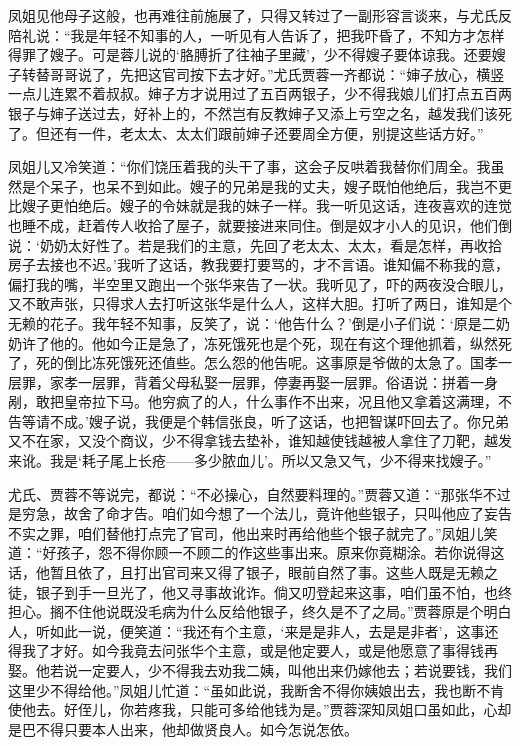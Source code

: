 凤姐见他母子这般，也再难往前施展了，只得又转过了一副形容言谈来，与尤氏反陪礼说：“我是年轻不知事的人，一听见有人告诉了，把我吓昏了，不知方才怎样得罪了嫂子。可是蓉儿说的‘胳膊折了往袖子里藏’，少不得嫂子要体谅我。还要嫂子转替哥哥说了，先把这官司按下去才好。”尤氏贾蓉一齐都说：“婶子放心，横竖一点儿连累不着叔叔。婶子方才说用过了五百两银子，少不得我娘儿们打点五百两银子与婶子送过去，好补上的，不然岂有反教婶子又添上亏空之名，越发我们该死了。但还有一件，老太太、太太们跟前婶子还要周全方便，别提这些话方好。”

凤姐儿又冷笑道：“你们饶压着我的头干了事，这会子反哄着我替你们周全。我虽然是个呆子，也呆不到如此。嫂子的兄弟是我的丈夫，嫂子既怕他绝后，我岂不更比嫂子更怕绝后。嫂子的令妹就是我的妹子一样。我一听见这话，连夜喜欢的连觉也睡不成，赶着传人收拾了屋子，就要接进来同住。倒是奴才小人的见识，他们倒说：‘奶奶太好性了。若是我们的主意，先回了老太太、太太，看是怎样，再收拾房子去接也不迟。’我听了这话，教我要打要骂的，才不言语。谁知偏不称我的意，偏打我的嘴，半空里又跑出一个张华来告了一状。我听见了，吓的两夜没合眼儿，又不敢声张，只得求人去打听这张华是什么人，这样大胆。打听了两日，谁知是个无赖的花子。我年轻不知事，反笑了，说：‘他告什么？’倒是小子们说：‘原是二奶奶许了他的。他如今正是急了，冻死饿死也是个死，现在有这个理他抓着，纵然死了，死的倒比冻死饿死还值些。怎么怨的他告呢。这事原是爷做的太急了。国孝一层罪，家孝一层罪，背着父母私娶一层罪，停妻再娶一层罪。俗语说：拼着一身剐，敢把皇帝拉下马。他穷疯了的人，什么事作不出来，况且他又拿着这满理，不告等请不成。’嫂子说，我便是个韩信张良，听了这话，也把智谋吓回去了。你兄弟又不在家，又没个商议，少不得拿钱去垫补，谁知越使钱越被人拿住了刀靶，越发来讹。我是‘耗子尾上长疮------多少脓血儿’。所以又急又气，少不得来找嫂子。”

尤氏、贾蓉不等说完，都说：“不必操心，自然要料理的。”贾蓉又道：“那张华不过是穷急，故舍了命才告。咱们如今想了一个法儿，竟许他些银子，只叫他应了妄告不实之罪，咱们替他打点完了官司，他出来时再给他些个银子就完了。”凤姐儿笑道：“好孩子，怨不得你顾一不顾二的作这些事出来。原来你竟糊涂。若你说得这话，他暂且依了，且打出官司来又得了银子，眼前自然了事。这些人既是无赖之徒，银子到手一旦光了，他又寻事故讹诈。倘又叨登起来这事，咱们虽不怕，也终担心。搁不住他说既没毛病为什么反给他银子，终久是不了之局。”贾蓉原是个明白人，听如此一说，便笑道：“我还有个主意，‘来是是非人，去是是非者’，这事还得我了才好。如今我竟去问张华个主意，或是他定要人，或是他愿意了事得钱再娶。他若说一定要人，少不得我去劝我二姨，叫他出来仍嫁他去；若说要钱，我们这里少不得给他。”凤姐儿忙道：“虽如此说，我断舍不得你姨娘出去，我也断不肯使他去。好侄儿，你若疼我，只能可多给他钱为是。”贾蓉深知凤姐口虽如此，心却是巴不得只要本人出来，他却做贤良人。如今怎说怎依。

